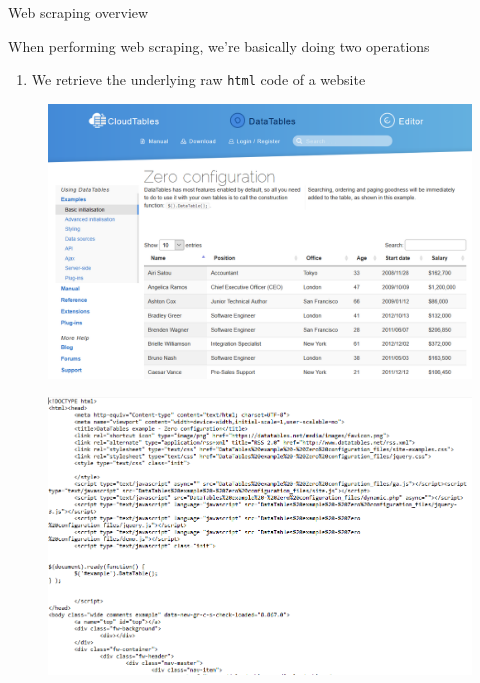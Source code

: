 \documentclass[aspectratio=169]{beamer}
\begin{document}
\begin{frame}{Web scraping overview}

	When performing web scraping, we're basically doing two operations

	\begin{enumerate}
		\item We retrieve the underlying raw \texttt{html} code of a website
	\end{enumerate}

	\begin{multicols}{2}

		\begin{figure}
			\centering
			\includegraphics[width=0.7\linewidth]{img/website_example.png}
		\end{figure}
		\begin{figure}
			\centering
			\includegraphics[width=\linewidth]{img/website_example_html.png}
		\end{figure}

	\end{multicols}

\end{frame}
\end{document}
